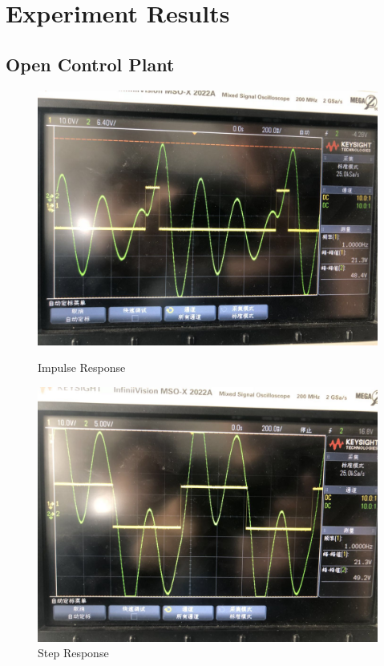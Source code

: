 \documentclass[12pt]{article}
\begin{document}
\section{Experiment Results}
\subsection{Open Control Plant}
\begin{figure}[H]
\centering
\includegraphics[scale=0.22]{P8.jpg}
\caption{Impulse Response}
\includegraphics[scale=0.22]{P9.jpg}
\caption{Step Response}
\end{figure}
\end{document}
